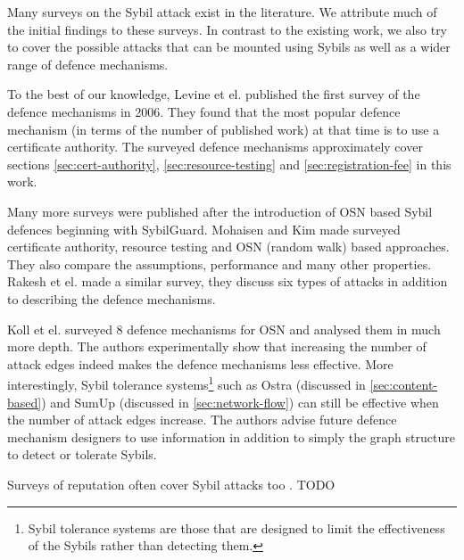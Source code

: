 Many surveys on the Sybil attack exist in the literature. We attribute much of
the initial findings to these surveys. In contrast to the existing work,
we also try to cover the possible attacks that can be mounted using Sybils as
well as a wider range of defence mechanisms.

To the best of our knowledge, Levine et el. published the first survey of the
defence mechanisms\cite{marti2006taxonomy} in 2006. They found that the most
popular defence mechanism (in terms of the number of published work) at that
time is to use a certificate authority. The surveyed defence mechanisms
approximately cover sections \ref{sec:cert-authority},
\ref{sec:resource-testing} and \ref{sec:registration-fee} in this work.

Many more surveys were published after the introduction of OSN based Sybil
defences beginning with SybilGuard. Mohaisen and Kim made surveyed certificate
authority, resource testing and OSN (random walk) based
approaches\cite{mohaisen2013sybil}. They also compare the assumptions,
performance and many other properties. Rakesh et el. made a similar
survey\cite{rakesh2014survey}, they discuss six types of attacks in addition to
describing the defence mechanisms.

Koll et el. surveyed 8 defence mechanisms for OSN and analysed them in much more
depth\cite{koll2014state}. The authors experimentally show that increasing the
number of attack edges indeed makes the defence mechanisms less effective. More
interestingly, Sybil tolerance systems\footnote{Sybil tolerance systems are
  those that are designed to limit the effectiveness of the Sybils rather than
  detecting them.} such as Ostra (discussed in \autoref{sec:content-based}) and
SumUp (discussed in \autoref{sec:network-flow}) can still be effective when the
number of attack edges increase. The authors advise future defence mechanism
designers to use information in addition to simply the graph structure to detect
or tolerate Sybils.

Surveys of reputation often cover Sybil attacks too \cite{marti2006taxonomy,
  hoffman2009survey, koutrouli2012taxonomy, selvaraj2012survey}. TODO


